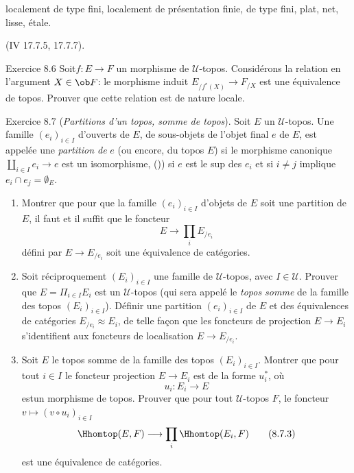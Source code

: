 \documentclass[10pt]{../fichiers-configuration-latex/smfart}
\begin{document}
localement de type fini, localement de présentation finie, de type
fini, plat, net, lisse, étale.

\noindent (\EGA IV 17.7.5, 17.7.7).

\begin{enonce*}[remark]{Exercice 8.6}
Soit\pageoriginale $f:E\rightarrow F$ un morphisme de
$𝒰$-topos. Considérons la relation en l'argument $X\in \ob
F$: le morphisme induit $E_{/f^{\ast}(X)}\rightarrow F_{/X}$ est une
équivalence de topos. Prouver que cette relation est de nature
locale.
\end{enonce*}

\begin{enonce*}[remark]{Exercice 8.7}
(\emph{Partitions d'un topos, somme de topos}). Soit $E$ un
$𝒰$-topos. Une famille $(e_i)_{i\in I}$ d'ouverts de $E$,
\ie de sous-objets de l'objet final $e$ de $E$, est appelée une
\emph{partition de} $e$ (ou encore, du topos $E$) si le morphisme
canonique $\amalg_{i\in I}e_i\rightarrow e$ est un isomorphisme, \ie
()) si $e$ est le sup des $e_i$ et si $i\neq j$
implique $e_i\cap e_j=∅_E$.
\begin{enumerate}
\renewcommand{\theenumi}{\alph{enumi}}
\renewcommand{\labelenumi}{\theenumi)}
\item Montrer que pour que la famille $(e_i)_{i\in I}$ d'objets de $E$
soit une partition de $E$, il faut et il suffit que le foncteur
\begin{equation*}
E\longrightarrow \prod_i E_{/e_i}\tag{8.7.1}
\end{equation*}
défini par  $E\rightarrow E_{/e_i}$ soit
une équivalence de catégories.

\item Soit réciproquement $(E_i)_{i\in I}$ une famille de
$𝒰$-topos, avec $I\in 𝒰$. Prouver que $E=\Pi_{i\in
I} E_i$ est un $𝒰$-topos (qui sera appelé le \emph{topos
somme} de la famille des topos $(E_i)_{i\in I}$). Définir une
partition $(e_i)_{i\in I}$ de $E$ et des équivalences de catégories
$E_{/e_i}\approx E_i$, de telle façon que les foncteurs de
projection $E\rightarrow E_i$ s'identifient aux foncteurs de
localisation $E\rightarrow E_{/e_i}$.

\item Soit $E$ le topos somme de la famille des topos $(E_i)_{i\in
I}$. Montrer que pour tout $i\in I$ le foncteur projection
$E\rightarrow E_i$ est de la forme $u^{\ast}_i$, où
\begin{equation*}
u_i:E_i\longrightarrow E\tag{8.7.2}
\end{equation*}
est\pageoriginale un morphisme de topos. Prouver que pour tout
$𝒰$-topos $F$, le foncteur $v\mapsto (v\circ u_i)_{i\in I}$
\begin{equation*}
\Hhomtop(E,F)\longrightarrow \prod_i\Hhomtop(E_i,F)\tag{8.7.3}
\end{equation*}
est une équivalence de catégories.


\end{enumerate}
\end{enonce*}
\end{document}
